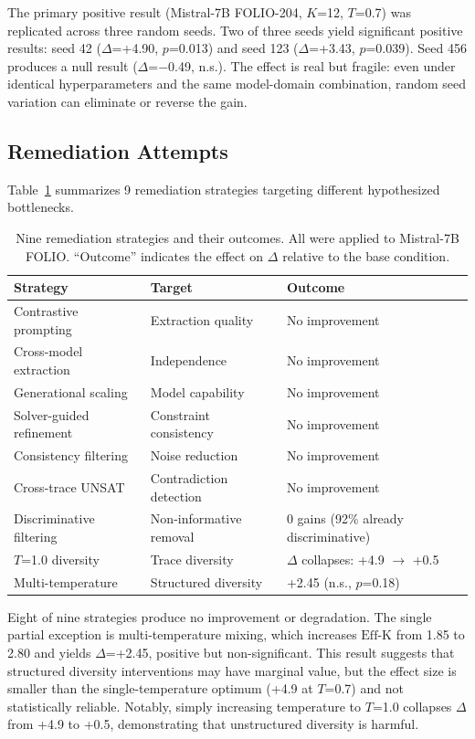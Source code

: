 \documentclass[11pt,a4paper]{article}
\newcommand{\effk}{\text{Eff-K}}
\newcommand{\pp}{\text{pp}}
\begin{document}
The primary positive result (Mistral-7B FOLIO-204, $K$=12, $T$=0.7) was replicated across three random seeds.
Two of three seeds yield significant positive results: seed 42 ($\Delta$=+4.90\pp{}, $p$=0.013) and seed 123 ($\Delta$=+3.43\pp{}, $p$=0.039).
Seed 456 produces a null result ($\Delta$=$-$0.49\pp{}, n.s.).
The effect is real but fragile: even under identical hyperparameters and the same model-domain combination, random seed variation can eliminate or reverse the gain.

\subsection{Remediation Attempts}

Table~\ref{tab:remediation} summarizes 9 remediation strategies targeting different hypothesized bottlenecks.

\begin{table}[t]
\centering
\caption{Nine remediation strategies and their outcomes. All were applied to Mistral-7B FOLIO. ``Outcome'' indicates the effect on $\Delta$ relative to the base condition.}
\label{tab:remediation}
\small
\begin{tabular}{p{3.5cm}p{3cm}p{4.5cm}}
\toprule
Strategy & Target & Outcome \\
\midrule
Contrastive prompting & Extraction quality & No improvement \\
Cross-model extraction & Independence & No improvement \\
Generational scaling & Model capability & No improvement \\
Solver-guided refinement & Constraint consistency & No improvement \\
Consistency filtering & Noise reduction & No improvement \\
Cross-trace UNSAT & Contradiction detection & No improvement \\
Discriminative filtering & Non-informative removal & 0 gains (92\% already discriminative) \\
$T$=1.0 diversity & Trace diversity & $\Delta$ collapses: +4.9 $\to$ +0.5\pp{} \\
Multi-temperature & Structured diversity & +2.45\pp{} (n.s., $p$=0.18) \\
\bottomrule
\end{tabular}
\end{table}

Eight of nine strategies produce no improvement or degradation.
The single partial exception is multi-temperature mixing, which increases $\effk{}$ from 1.85 to 2.80 and yields $\Delta$=+2.45\pp{}, positive but non-significant.
This result suggests that structured diversity interventions may have marginal value, but the effect size is smaller than the single-temperature optimum (+4.9\pp{} at $T$=0.7) and not statistically reliable.
Notably, simply increasing temperature to $T$=1.0 collapses $\Delta$ from +4.9 to +0.5\pp{}, demonstrating that unstructured diversity is harmful.
\end{document}
